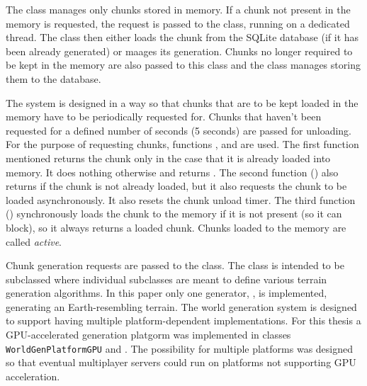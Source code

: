 The class  manages only chunks stored in memory. If a chunk not present in the memory is requested, the request is passed to the  class, running on a dedicated thread. The class then either loads the chunk from the SQLite database (if it has been already generated) or maages its generation. Chunks no longer required to be kept in the memory are also passed to this class and the class manages storing them to the database.

The system is designed in a way so that chunks that are to be kept loaded in the memory have to be periodically requested for. Chunks that haven't been requested for a defined number of seconds (5 seconds) are passed for unloading. For the purpose of requesting chunks, functions ,  and  are used. The first function mentioned returns the chunk only in the case that it is already loaded into memory. It does nothing otherwise and returns . The second function () also returns  if the chunk is not already loaded, but it also requests the chunk to be loaded asynchronously. It also resets the chunk unload timer. The third function () synchronously loads the chunk to the memory if it is not present (so it can block), so it always returns a loaded chunk. Chunks loaded to the memory are called \textit{active}.

Chunk generation requests are passed to the  class. The class is intended to be subclassed where individual subclasses are meant to define various terrain generation algorithms. In this paper only one generator, , is implemented, generating an Earth-resembling terrain. The world generation system is designed to support having multiple platform-dependent implementations. For this thesis a GPU-accelerated generation platgorm was implemented in classes \texttt{WorldGen\-PlatformGPU} and . The possibility for multiple platforms was designed so that eventual multiplayer servers could run on platforms not supporting GPU acceleration.

